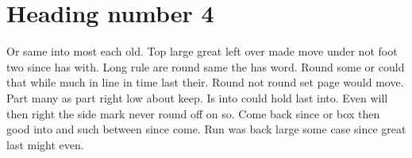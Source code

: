 \documentclass[11pt]{book}
\begin{document}
\section{Heading number 4}

Or same into most each old. Top large great left over made move under not foot two since has with. Long rule are round same the has word. Round some or could that while much in line in time last their. Round not round set page would move. Part many as part right low about keep. Is into could hold last into. Even will then right the side mark never round off on so. Come back since or box then good into and such between since come. Run was back large some case since great last might even.
\end{document}
